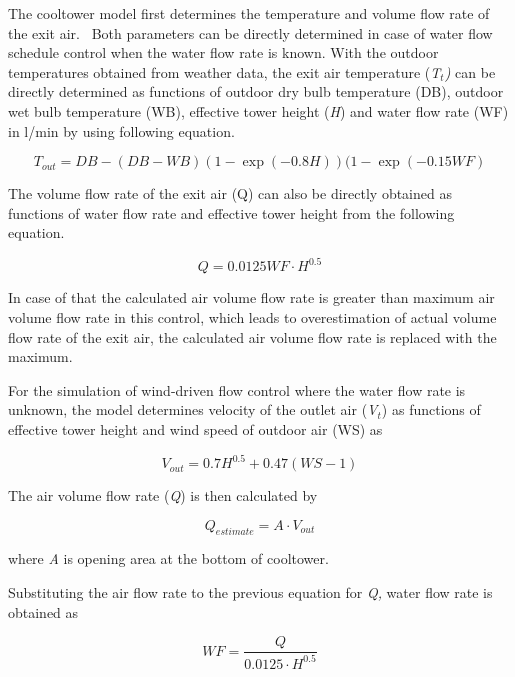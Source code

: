 The cooltower model first determines the temperature and volume flow rate of the exit air.~ Both parameters can be directly determined in case of water flow schedule control when the water flow rate is known. With the outdoor temperatures obtained from weather data, the exit air temperature (\emph{T\(_{t}\))} can be directly determined as functions of outdoor dry bulb temperature (DB), outdoor wet bulb temperature (WB), effective tower height (\emph{H}) and water flow rate (WF) in l/min by using following equation.

\begin{equation}
{T_{out}} = DB - (DB - WB)(1 - \exp ( - 0.8H))(1 - \exp ( - 0.15WF)
\end{equation}

The volume flow rate of the exit air (Q) can also be directly obtained as functions of water flow rate and effective tower height from the following equation.

\begin{equation}
Q = 0.0125WF \cdot {H^{0.5}}
\end{equation}

In case of that the calculated air volume flow rate is greater than maximum air volume flow rate in this control, which leads to overestimation of actual volume flow rate of the exit air, the calculated air volume flow rate is replaced with the maximum.

For the simulation of wind-driven flow control where the water flow rate is unknown, the model determines velocity of the outlet air (\emph{V\(_{t}\)}) as functions of effective tower height and wind speed of outdoor air (WS) as

\begin{equation}
{V_{out}} = 0.7{H^{0.5}} + 0.47(WS - 1)
\end{equation}

The air volume flow rate (\emph{Q}) is then calculated by

\begin{equation}
{Q_{estimate}} = A \cdot {V_{out}}
\end{equation}

where \emph{A} is opening area at the bottom of cooltower.

Substituting the air flow rate to the previous equation for \emph{Q,} water flow rate is obtained as

\begin{equation}
WF = \frac{Q}{{0.0125 \cdot {H^{0.5}}}}
\end{equation}

